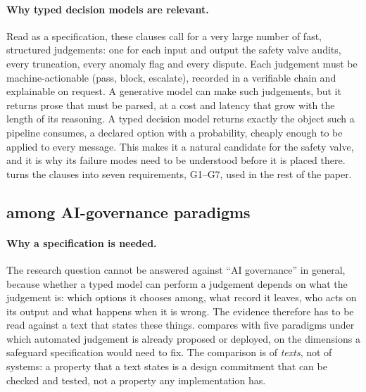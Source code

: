 \paragraph{Why typed decision models are relevant.}
Read as a specification, these clauses call for a very large number of fast, structured judgements: one for each input and output the safety valve audits, every truncation, every anomaly flag and every dispute.
Each judgement must be machine-actionable (pass, block, escalate), recorded in a verifiable chain and explainable on request.
A generative model can make such judgements, but it returns prose that must be parsed, at a cost and latency that grow with the length of its reasoning.
A typed decision model returns exactly the object such a pipeline consumes, a declared option with a probability, cheaply enough to be applied to every message.
This makes it a natural candidate for the safety valve, and it is why its failure modes need to be understood before it is placed there.
 turns the clauses into seven requirements, G1--G7, used in the rest of the paper.

\subsection{\pol{} among AI-governance paradigms}
\label{sec:paradigms}

\paragraph{Why a specification is needed.}
The research question cannot be answered against ``AI governance'' in general, because whether a typed model can perform a judgement depends on what the judgement is: which options it chooses among, what record it leaves, who acts on its output and what happens when it is wrong.
The evidence therefore has to be read against a text that states these things.
 compares \pol{} with five paradigms under which automated judgement is already proposed or deployed, on the dimensions a safeguard specification would need to fix.
The comparison is of \emph{texts}, not of systems: a property that a text states is a design commitment that can be checked and tested, not a property any implementation has.

